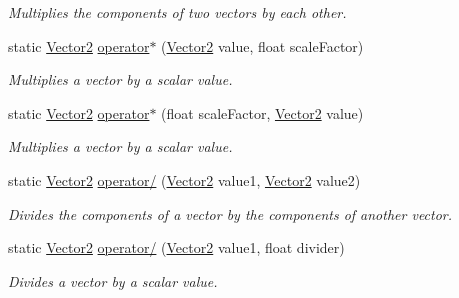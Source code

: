 \begin{DoxyCompactItemize}
\begin{DoxyCompactList}\small\item\em Multiplies the components of two vectors by each other.\end{DoxyCompactList}\item 
static \hyperlink{struct_microsoft_1_1_xna_1_1_framework_1_1_vector2}{Vector2} \hyperlink{struct_microsoft_1_1_xna_1_1_framework_1_1_vector2_a6c4efbfc69cb23b63dbb28e62f779353}{operator$\ast$} (\hyperlink{struct_microsoft_1_1_xna_1_1_framework_1_1_vector2}{Vector2} value, float scale\+Factor)
\begin{DoxyCompactList}\small\item\em Multiplies a vector by a scalar value.\end{DoxyCompactList}\item 
static \hyperlink{struct_microsoft_1_1_xna_1_1_framework_1_1_vector2}{Vector2} \hyperlink{struct_microsoft_1_1_xna_1_1_framework_1_1_vector2_a158520a0088078dfebf46347d4387bf8}{operator$\ast$} (float scale\+Factor, \hyperlink{struct_microsoft_1_1_xna_1_1_framework_1_1_vector2}{Vector2} value)
\begin{DoxyCompactList}\small\item\em Multiplies a vector by a scalar value.\end{DoxyCompactList}\item 
static \hyperlink{struct_microsoft_1_1_xna_1_1_framework_1_1_vector2}{Vector2} \hyperlink{struct_microsoft_1_1_xna_1_1_framework_1_1_vector2_acdc4770a856249d18c53f0b4ee1c4955}{operator/} (\hyperlink{struct_microsoft_1_1_xna_1_1_framework_1_1_vector2}{Vector2} value1, \hyperlink{struct_microsoft_1_1_xna_1_1_framework_1_1_vector2}{Vector2} value2)
\begin{DoxyCompactList}\small\item\em Divides the components of a vector by the components of another vector.\end{DoxyCompactList}\item 
static \hyperlink{struct_microsoft_1_1_xna_1_1_framework_1_1_vector2}{Vector2} \hyperlink{struct_microsoft_1_1_xna_1_1_framework_1_1_vector2_a694eff1433cd29a529da6c2f23ec6a86}{operator/} (\hyperlink{struct_microsoft_1_1_xna_1_1_framework_1_1_vector2}{Vector2} value1, float divider)
\begin{DoxyCompactList}\small\item\em Divides a vector by a scalar value.\end{DoxyCompactList}\end{DoxyCompactItemize}
